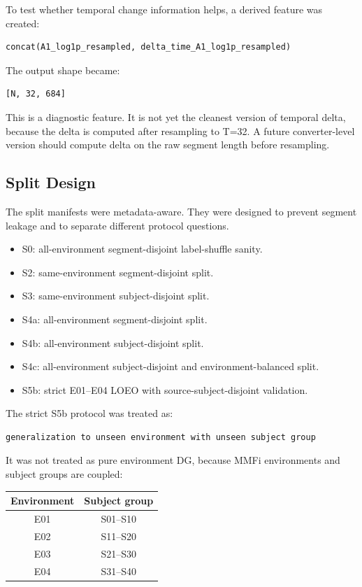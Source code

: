 \documentclass[11pt]{article}
\begin{document}
To test whether temporal change information helps, a derived feature was created:

\begin{verbatim}
concat(A1_log1p_resampled, delta_time_A1_log1p_resampled)
\end{verbatim}

The output shape became:

\begin{verbatim}
[N, 32, 684]
\end{verbatim}

This is a diagnostic feature. It is not yet the cleanest version of temporal delta, because the delta is computed after resampling to T=32. A future converter-level version should compute delta on the raw segment length before resampling.

\subsection{Split Design}

The split manifests were metadata-aware. They were designed to prevent segment leakage and to separate different protocol questions.

\begin{itemize}
  \item S0: all-environment segment-disjoint label-shuffle sanity.
  \item S2: same-environment segment-disjoint split.
  \item S3: same-environment subject-disjoint split.
  \item S4a: all-environment segment-disjoint split.
  \item S4b: all-environment subject-disjoint split.
  \item S4c: all-environment subject-disjoint and environment-balanced split.
  \item S5b: strict E01--E04 LOEO with source-subject-disjoint validation.
\end{itemize}

The strict S5b protocol was treated as:

\begin{verbatim}
generalization to unseen environment with unseen subject group
\end{verbatim}

It was not treated as pure environment DG, because MMFi environments and subject groups are coupled:

\begin{center}
\begin{tabular}{cc}
\toprule
Environment & Subject group \\
\midrule
E01 & S01--S10 \\
E02 & S11--S20 \\
E03 & S21--S30 \\
E04 & S31--S40 \\
\bottomrule
\end{tabular}
\end{center}
\end{document}
